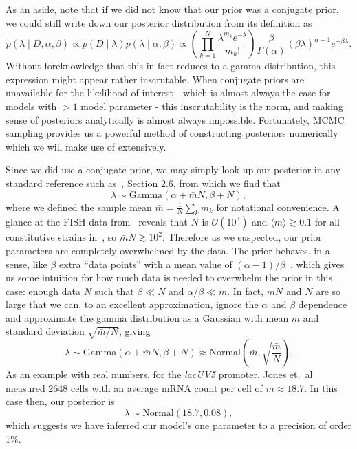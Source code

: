 As an aside, note that if we did not know that our prior was a conjugate prior,
we could still write down our posterior distribution from its definition as
\begin{equation}
p(\lambda\mid D,\alpha,\beta)
\propto p(D\mid\lambda) p(\lambda \mid\alpha,\beta)
\propto \left(\prod_{k=1}^N \frac{\lambda^{m_k}e^{-\lambda}}{m_k!}\right)
        \frac{\beta}{\Gamma(\alpha)}(\beta\lambda)^{\alpha-1} e^{-\beta\lambda}
.
\end{equation}
Without foreknowledge that this in fact reduces to a gamma distribution, this
expression might appear rather inscrutable. When conjugate priors are
unavailable for the likelihood of interest - which is almost always the case for
models with $>1$ model parameter - this inscrutability is the norm, and making
sense of posteriors analytically is almost always impossible. Fortunately, MCMC
sampling provides us a powerful method of constructing posteriors numerically
which we will make use of extensively.

Since we did use a conjugate prior, we may simply look up our posterior in any
standard reference such as~\cite{Gelman2013}, Section 2.6,
from which we find that
\begin{equation}
\lambda
\sim \text{Gamma}\left(\alpha + \bar{m}N, \beta + N\right),
\end{equation}
where we defined the sample mean $\bar{m} = \frac{1}{N}\sum_k m_k$ for
notational convenience. A glance at the FISH data from~\cite{Jones2014} reveals
that $N$ is $\mathcal{O}(10^3)$ and $\langle m\rangle \gtrsim 0.1$ for all
constitutive strains in~\cite{Jones2014}, so $\bar{m}N \gtrsim 10^2$. Therefore
as we suspected, our prior parameters are completely overwhelmed by the data.
The prior behaves, in a sense, like $\beta$ extra ``data points''
with a mean value of $(\alpha-1)/\beta$~\cite{Gelman2013}, which
gives us some intuition for how much data is needed to overwhelm
the prior in this case: enough data $N$ such that $\beta\ll N$
and $\alpha/\beta \ll \bar{m}$. In
fact, $\bar{m}N$ and $N$ are so large that we can, to an excellent
approximation, ignore the $\alpha$ and $\beta$ dependence and approximate the
gamma distribution as a Gaussian with mean $\bar{m}$ and standard deviation
$\sqrt{\bar{m}/N}$, giving
\begin{equation}
\lambda
\sim \text{Gamma}\left(\alpha + \bar{m}N, \beta + N\right)
\approx \text{Normal}\left(\bar{m}, \sqrt{\frac{\bar{m}}{N}}\right).
\end{equation}
As an example with real numbers, for the \textit{lacUV5} promoter, Jones et.\
al~\cite{Jones2014} measured 2648 cells with an average mRNA count per cell of
$\bar{m} \approx 18.7$. In this case then, our posterior is
\begin{equation}
\lambda
\sim \text{Normal}\left(18.7, 0.08\right),
\label{eq:gauss_posterior}
\end{equation}
which suggests we have inferred our model's one parameter to a precision of
order 1\%.

